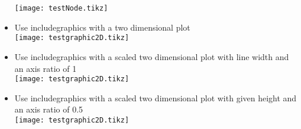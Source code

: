 \documentclass[twocolumn]{article}
\begin{document}
\begin{itemize}
			\texttt{[image: testNode.tikz]}%
		\item Use includegraphics with a two dimensional plot\\%
			\texttt{[image: testgraphic2D.tikz]}%
		\item Use includegraphics with a scaled two dimensional plot with line width and an axis ratio of 1\\%
			\texttt{[image: testgraphic2D.tikz]}%
		\item Use includegraphics with a scaled two dimensional plot with given height and an axis ratio of 0.5\\%
			\texttt{[image: testgraphic2D.tikz]}%
	\end{itemize}
\end{document}
